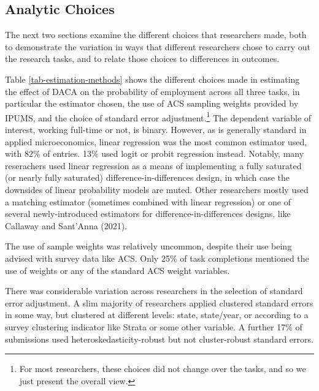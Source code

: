 \documentclass[
  letterpaper,
  DIV=11,
  numbers=noendperiod]{scrartcl}
\begin{document}
\subsection{Analytic Choices}\label{sec-analytic}

The next two sections examine the different choices that researchers
made, both to demonstrate the variation in ways that different
researchers chose to carry out the research tasks, and to relate those
choices to differences in outcomes.

Table \ref{tab-estimation-methods} shows the different choices made in
estimating the effect of DACA on the probability of employment across
all three tasks, in particular the estimator chosen, the use of ACS
sampling weights provided by IPUMS, and the choice of standard error
adjustment.\footnote{For most researchers, these choices did not change
  over the tasks, and so we just present the overall view.} The
dependent variable of interest, working full-time or not, is binary.
However, as is generally standard in applied microeconomics, linear
regression was the most common estimator used, with 82\% of entries.
13\% used logit or probit regression instead. Notably, many reserachers
used linear regression as a means of implementing a fully saturated (or
nearly fully saturated) difference-in-differences design, in which case
the downsides of linear probability models are muted. Other researchers
mostly used a matching estimator (sometimes combined with linear
regression) or one of several newly-introduced estimators for
difference-in-differences designs, like Callaway and Sant'Anna (2021).

The use of sample weights was relatively uncommon, despite their use
being advised with survey data like ACS. Only 25\% of task completions
mentioned the use of weights or any of the standard ACS weight
variables.

There was considerable variation across researchers in the selection of
standard error adjustment. A slim majority of researchers applied
clustered standard errors in some way, but clustered at different
levels: state, state/year, or according to a survey clustering indicator
like Strata or some other variable. A further 17\% of submissions used
heteroskedasticity-robust but not cluster-robust standard errors.
\end{document}
